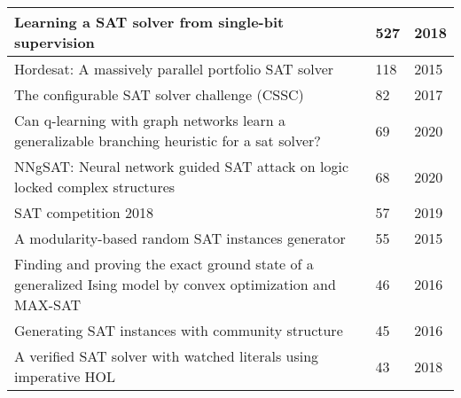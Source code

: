 \begin{longtable}{|p{10cm}|P{2cm}|P{2.6cm}|}
    Learning a SAT solver from single-bit supervision                                                          & 527                                                                      & 2018                                                                    \\ \hline
    Hordesat: A massively parallel portfolio SAT solver                                                        & 118                                                                      & 2015                                                                    \\ \hline
    The configurable SAT solver challenge (CSSC)                                                               & 82                                                                       & 2017                                                                    \\ \hline
    Can q-learning with graph networks learn a generalizable branching heuristic for a sat solver?             & 69                                                                       & 2020                                                                    \\ \hline
    NNgSAT: Neural network guided SAT attack on logic locked complex structures                                & 68                                                                       & 2020                                                                    \\ \hline
    SAT competition 2018                                                                                       & 57                                                                       & 2019                                                                    \\ \hline
    A modularity-based random SAT instances generator                                                          & 55                                                                       & 2015                                                                    \\ \hline
    Finding and proving the exact ground state of a generalized Ising model by convex optimization and MAX-SAT & 46                                                                       & 2016                                                                    \\ \hline
    Generating SAT instances with community structure                                                          & 45                                                                       & 2016                                                                    \\ \hline
    A verified SAT solver with watched literals using imperative HOL                                           & 43                                                                       & 2018                                                                    \\ \hline

\end{longtable}




